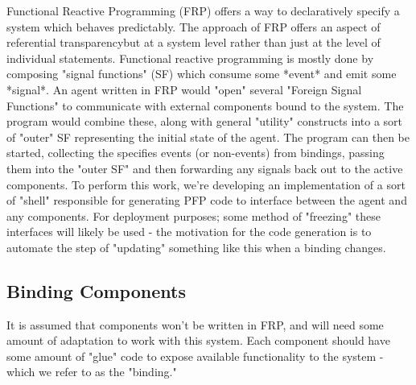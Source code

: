Functional Reactive Programming (FRP) offers a way to declaratively specify a system which behaves predictably.\cite{perez2017testing}
    The approach of FRP offers an aspect of referential transparency\footnotemark but at a system level rather than just at the level of individual statements.
    Functional reactive programming is mostly done by composing "signal functions" (SF) which consume some *event* and emit some *signal*.\footnotemark
    An agent written in FRP would "open" several "Foreign Signal Functions" to communicate with external components bound to the system.
    The program would combine these, along with general "utility" constructs into a sort of "outer" SF representing the initial state of the agent.
    The program can then be started, collecting the specifies events (or non-events) from bindings, passing them into the "outer SF" and then forwarding any signals back out to the active components.
To perform this work, we're developing an implementation of a sort of "shell" responsible for generating PFP code to interface between the agent and any components.
    For deployment purposes; some method of "freezing" these interfaces will likely be used - the motivation for the code generation is to automate the step of "updating" something like this when a binding changes.


\subsection{Binding Components}

It is assumed that components won't be written in FRP, and will need some amount of adaptation to work with this system.
Each component should have some amount of "glue" code to expose available functionality to the system - which we refer to as the "binding."

